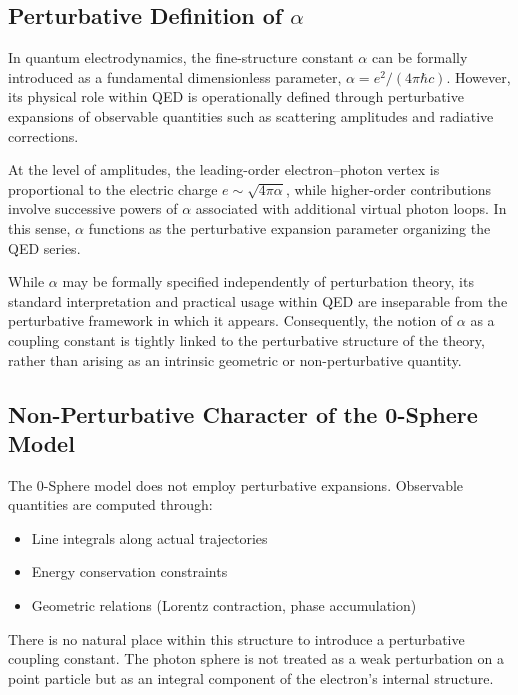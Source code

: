 \documentclass[12pt,letterpaper]{article}
\begin{document}
\subsection{Perturbative Definition of $\alpha$}

In quantum electrodynamics, the fine-structure constant $\alpha$ can be formally introduced as a fundamental dimensionless parameter, $\alpha = e^2/(4\pi\hbar c)$. However, its physical role within QED is operationally defined through perturbative expansions of observable quantities such as scattering amplitudes and radiative corrections.

At the level of amplitudes, the leading-order electron--photon vertex is proportional to the electric charge $e \sim \sqrt{4\pi\alpha}$, while higher-order contributions involve successive powers of $\alpha$ associated with additional virtual photon loops. In this sense, $\alpha$ functions as the perturbative expansion parameter organizing the QED series.

While $\alpha$ may be formally specified independently of perturbation theory, its standard interpretation and practical usage within QED are inseparable from the perturbative framework in which it appears. Consequently, the notion of $\alpha$ as a coupling constant is tightly linked to the perturbative structure of the theory, rather than arising as an intrinsic geometric or non-perturbative quantity.


\subsection{Non-Perturbative Character of the 0-Sphere Model}

The 0-Sphere model does not employ perturbative expansions. Observable quantities are computed through:
\begin{itemize}
\item Line integrals along actual trajectories
\item Energy conservation constraints
\item Geometric relations (Lorentz contraction, phase accumulation)
\end{itemize}

There is no natural place within this structure to introduce a perturbative coupling constant. The photon sphere is not treated as a weak perturbation on a point particle but as an integral component of the electron's internal structure.
\end{document}
